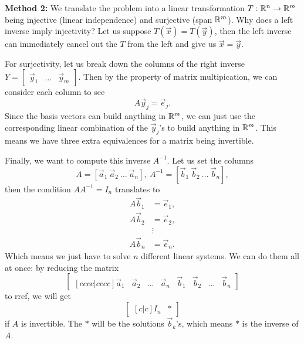 \textbf{Method 2:}
We translate the problem into a linear transformation $T:\mathbb{R}^n\to\mathbb{R}^m$ being injective (linear independence) and surjective (span $\mathbb{R}^m$).
Why does a left inverse imply injectivity? Let us suppose $T(\vec{x})=T(\vec{y})$, then the left inverse can immediately cancel out the $T$ from the left and give us $\vec{x}=\vec{y}$.

For surjectivity, let us break down the columns of the right inverse $Y=\begin{bmatrix}
    \vec{y}_1 & \ldots &\vec{y}_m
\end{bmatrix}$.
Then by the property of matrix multipication, we can consider each column to see \[
A\vec{y}_j = \vec{e}_j.
\]
Since the basis vectors can build anything in $\mathbb{R}^m$, we can just use the corresponding linear combination of the $\vec{y}_j$'s to build anything in $\mathbb{R}^m$.
This means we have three extra equivalences for a matrix being invertible.


Finally, we want to compute this inverse $A^{-1}$. Let us set the columns \[
A=[\vec{a}_1 \ \vec{a}_2 \ \ldots \ \vec{a}_n],\ 
A^{-1}=[\vec{b}_1 \ \vec{b}_2 \ \ldots \ \vec{b}_n],
\] 
then the condition $AA^{-1}=I_n$ translates to \begin{align*}
	A\vec{b}_1&=\vec{e}_1,\\
	A\vec{b}_2&=\vec{e}_2,\\
	&\vdots \\
	A\vec{b}_n&=\vec{e}_n.
\end{align*}
Which means we just have to solve $n$ different linear systems. We can do them all at once: by reducing the matrix \[
\begin{bmatrix}[cccc|cccc]
	\vec{a}_1 & \vec{a}_2 & \ldots &\vec{a}_n
	&\vec{b}_1 & \vec{b}_2 & \ldots &\vec{b}_n
\end{bmatrix}
\]
to rref,
we will get \[
\begin{bmatrix}[c|c]
	I_n & *
\end{bmatrix}
\]
if $A$ is invertible. The $*$ will be the solutions $\vec{b}_k$'s, which means $*$ is the inverse of $A$.

